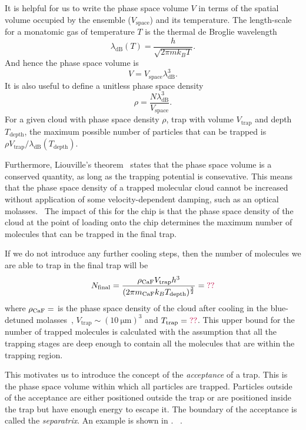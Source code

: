 It is helpful for us to write the phase space volume $V$ in terms of the
spatial volume occupied by the ensemble ($V_\text{space}$) and its temperature.
The length-scale for a monatomic gas of temperature $T$ is the thermal de
Broglie wavelength~\cite{blundell2}
%
\begin{equation}
  \lambda_\text{dB}(T) = \frac{h}{\sqrt{2 \pi m k_B T}}.
\end{equation}
And hence the phase space volume is 
%
\begin{equation}
  V = V_\text{space} \lambda_\text{dB}^3.
\end{equation}
%
It is also useful to define a unitless phase space
density~\cite{PhysRevA.52.1423}
%
\begin{equation}
  \rho = \frac{N \lambda_\text{dB}^3}{V_\text{space}}.
\end{equation}
%
For a given cloud with phase space density $\rho$, trap with volume
$V_\text{trap}$ and depth $T_\text{depth}$,
the maximum possible number of particles that can be trapped is $\rho
V_\text{trap}/\lambda_\text{dB}(T_\text{depth})$.

Furthermore, Liouville's theorem~\cite{Landau1982, Hand1998} states that the
phase space volume is a conserved quantity, as long as the trapping potential
is consevative. This means that the phase space density of a trapped molecular
cloud cannot be increased without application of some velocity-dependent
damping, such as an optical molasses.~\cite{} The impact of this for the chip
is that the phase space density of the cloud at the point of loading onto the
chip determines the maximum number of molecules that can be trapped in the
final trap.


If we do not introduce any further cooling steps, then the number of molecules
we are able to trap in the final trap will be
%
\begin{equation}
  N_\text{final} = \frac{\rho_\text{CaF{}} V_\text{trap} h^3}{(2 \pi m_\text{CaF} k_B
  T_\text{depth})^\frac{3}{2}} = \textcolor{purple}{??}
  \label{design:eq:psd_N}
\end{equation}
%
where $\rho_\text{CaF{}} = $ is the phase space density of the \CaF{} cloud
after cooling in the blue-detuned molasses~\cite{Truppe2017},
$V_\text{trap}\sim(\SI{10}{\micro\meter})^3$ and $T_\text{trap}=\textcolor{purple}{??}$.
%
This upper bound for the number of trapped molecules is calculated with the
assumption that all the trapping stages are deep enough to contain all the
molecules that are within the trapping region. 

This motivates us to introduce the concept of the \emph{acceptance} of a trap.
This is the phase space volume within which all particles are trapped.
Particles outside of the acceptance are either positioned outside the trap or
are positioned inside the trap but have enough energy to escape it. The
boundary of the acceptance is called the \emph{separatrix}. An example is shown
in .~\cite{Lichtenberg1969, HanHand1998}
.


